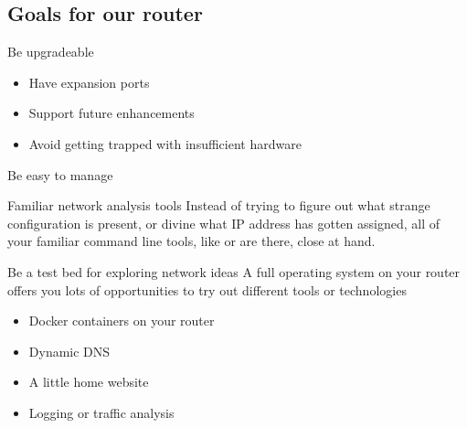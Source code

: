 \documentclass[bigger,aspectratio=169]{beamer}
\begin{document}
\subsection{Goals for our router}
\label{sec:org778996d}

\begin{frame}[label={sec:org8d79961}]{Be upgradeable}
  \begin{itemize}
  \item Have expansion ports
  \item Support future enhancements
  \item Avoid getting trapped with insufficient hardware
  \end{itemize}
\end{frame}

\begin{frame}[label={sec:org1c4cf14}]{Be easy to manage}
\begin{block}{Familiar network analysis tools}
Instead of trying to figure out what strange configuration is present, or
divine what IP address has gotten assigned, all of your familiar command
line tools, like or are there, close at
hand.
\end{block}
\end{frame}

\begin{frame}[label={sec:org100ce9b}]{Be a test bed for exploring network ideas}
A full operating system on your router offers you lots of opportunities to
try out different tools or technologies

\begin{itemize}
  \item Docker containers on your router

  \item<2-> Dynamic DNS
  \item<3-> A little home website
  \item<4-> Logging or traffic analysis
\end{itemize}
\end{frame}
\end{document}
